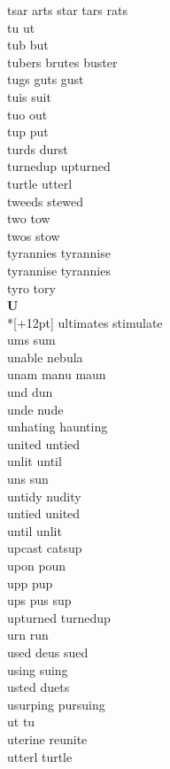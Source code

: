 tsar arts star tars rats\\
tu ut\\
tub but\\
tubers brutes buster\\
tugs guts gust\\
tuis suit\\
tuo out\\
tup put\\
turds durst\\
turnedup upturned\\
turtle utterl\\
tweeds stewed\\
two tow\\
twos stow\\
tyrannies tyrannise\\
tyrannise tyrannies\\
tyro tory\\

\vspace{14pt}
\noindent\textbf{\Large U}\\*[+12pt]
ultimates stimulate\\
ums sum\\
unable nebula\\
unam manu maun\\
und dun\\
unde nude\\
unhating haunting\\
united untied\\
unlit until\\
uns sun\\
untidy nudity\\
untied united\\
until unlit\\
upcast catsup\\
upon poun\\
upp pup\\
ups pus sup\\
upturned turnedup\\
urn run\\
used deus sued\\
using suing\\
usted duets\\
usurping pursuing\\
ut tu\\
uterine reunite\\
utterl turtle\\

